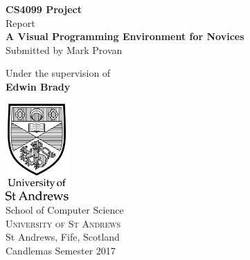 \begin{titlepage}

\begin{center}

\textup{\small {\bf CS4099 Project} \\ Report}\\[0.2in]

\Large \textbf {A Visual Programming Environment for Novices}\\[0.5in]

\normalsize Submitted by Mark Provan

\vspace{.1in}
Under the supervision of\\
{\textbf{Edwin Brady}}\\[0.2in]

\vfill

\includegraphics[width=0.18\textwidth]{sta-logo}\\[0.1in]
\Large{School of Computer Science}\\
\normalsize
\textsc{University of St Andrews}\\
St Andrews, Fife, Scotland \\
\vspace{0.2cm}
Candlemas Semester 2017

\end{center}

\end{titlepage}
